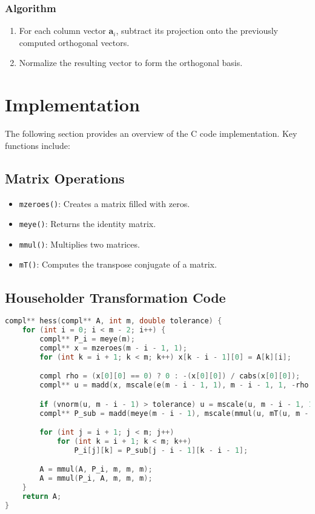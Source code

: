 \documentclass[12pt]{article}
\begin{document}
\subsubsection{Algorithm}
\begin{enumerate}
    \item For each column vector $\mathbf{a}_i$, subtract its projection onto the previously computed orthogonal vectors.
    \item Normalize the resulting vector to form the orthogonal basis.
\end{enumerate}

\section{Implementation}
The following section provides an overview of the C code implementation. Key functions include:

\subsection{Matrix Operations}
\begin{itemize}
    \item \texttt{mzeroes()}: Creates a matrix filled with zeros.
    \item \texttt{meye()}: Returns the identity matrix.
    \item \texttt{mmul()}: Multiplies two matrices.
    \item \texttt{mT()}: Computes the transpose conjugate of a matrix.
\end{itemize}

\subsection{Householder Transformation Code}
\begin{lstlisting}[language=C, caption=Hessenberg Reduction]
compl** hess(compl** A, int m, double tolerance) {
    for (int i = 0; i < m - 2; i++) {
        compl** P_i = meye(m);
        compl** x = mzeroes(m - i - 1, 1);
        for (int k = i + 1; k < m; k++) x[k - i - 1][0] = A[k][i];

        compl rho = (x[0][0] == 0) ? 0 : -(x[0][0]) / cabs(x[0][0]);
        compl** u = madd(x, mscale(e(m - i - 1, 1), m - i - 1, 1, -rho * vnorm(x, m - i - 1)), m - i - 1, 1);

        if (vnorm(u, m - i - 1) > tolerance) u = mscale(u, m - i - 1, 1, 1 / vnorm(u, m - i - 1));
        compl** P_sub = madd(meye(m - i - 1), mscale(mmul(u, mT(u, m - i - 1, 1), m - i - 1, 1, m - i - 1), -2), m - i - 1, m - i - 1);

        for (int j = i + 1; j < m; j++)
            for (int k = i + 1; k < m; k++)
                P_i[j][k] = P_sub[j - i - 1][k - i - 1];

        A = mmul(A, P_i, m, m, m);
        A = mmul(P_i, A, m, m, m);
    }
    return A;
}
\end{lstlisting}
\end{document}
